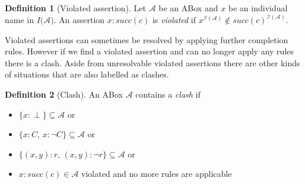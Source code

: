 \documentclass{book}
\theoremstyle{break}
\theoremstyle{definition}
\newtheorem{mydef}{Definition}
\begin{document}
\begin{mydef}[Violated assertion]
Let $\mathcal{A}$ be an ABox and $x$ be an individual name in $I(\mathcal{A)}$. An assertion $x:succ(c)$ is \textit{violated} if $x^{\mathcal{I}(\mathcal{A})}\notin succ(c)^{\mathcal{I}(\mathcal{A})}$.
\end{mydef}
Violated assertions can sometimes be resolved by applying further completion rules. However if we find a violated assertion and can no longer apply any rules there is a clash. Aside from unresolvable violated assertions there are other kinds of situations that are also labelled as clashes. 
\begin{mydef}[Clash]
An ABox $\mathcal{A}$ contains a \textit{clash} if
\begin{itemize}
\item $\{x:\perp\}\subseteq \mathcal{A}$ or
\item $\{x:C,\,x:\neg C\}\subseteq \mathcal{A}$ or
\item $\{(x,y):r,\,(x,y):\neg r\}\subseteq \mathcal{A}$ or
\item $x:succ(c)\in \mathcal{A}$ violated and no more rules are applicable
\end{itemize}
\end{mydef}
\end{document}
